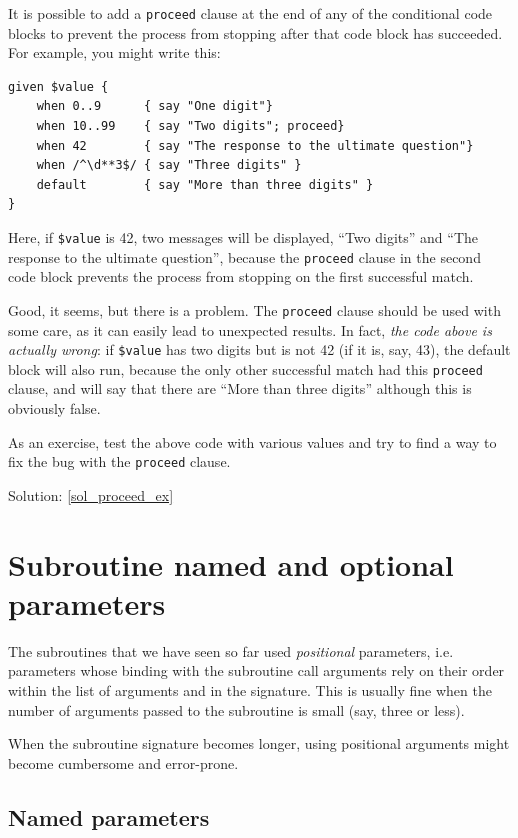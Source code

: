 It is possible to add a {\tt proceed} clause at the end of 
any of the conditional code blocks to prevent the process 
from stopping after that code block has succeeded. For example, 
you might write this:

\begin{verbatim}
given $value {
    when 0..9      { say "One digit"}
    when 10..99    { say "Two digits"; proceed}
    when 42        { say "The response to the ultimate question"}
    when /^\d**3$/ { say "Three digits" }
    default        { say "More than three digits" }
}
\end{verbatim}

Here, if \verb'$value' is 42, two messages will be displayed,  
``Two digits'' and ``The response to the ultimate question'', 
because the {\tt proceed} clause in the second code block 
prevents the process from stopping on the first successful match.

Good, it seems, but there is a problem. The {\tt proceed} clause 
should be used with some care, as it can easily lead 
to unexpected results. In fact, \emph{the code above 
is actually wrong}: if \verb'$value' has two digits but is 
not 42 (if it is, say, 43), the default block will also run, 
because the only other successful match had this {\tt proceed} 
clause, and will say that there are ``More than three digits'' 
although this is obviously false. 

\label{proceed_ex}
As an exercise, test the above code with various values and 
try to find a way to fix the bug with the {\tt proceed} 
clause.

Solution: \ref{sol_proceed_ex}

\section{Subroutine named and optional parameters}

The subroutines that we have seen so far used \emph{positional} 
parameters, i.e. parameters whose binding with the subroutine 
call arguments rely on their order within the list of 
arguments and in the signature. This is usually fine when 
the number of arguments passed to the subroutine is small 
(say, three or less). 

When the subroutine signature becomes longer, using positional 
arguments might become cumbersome and error-prone. 

\subsection{Named parameters}

